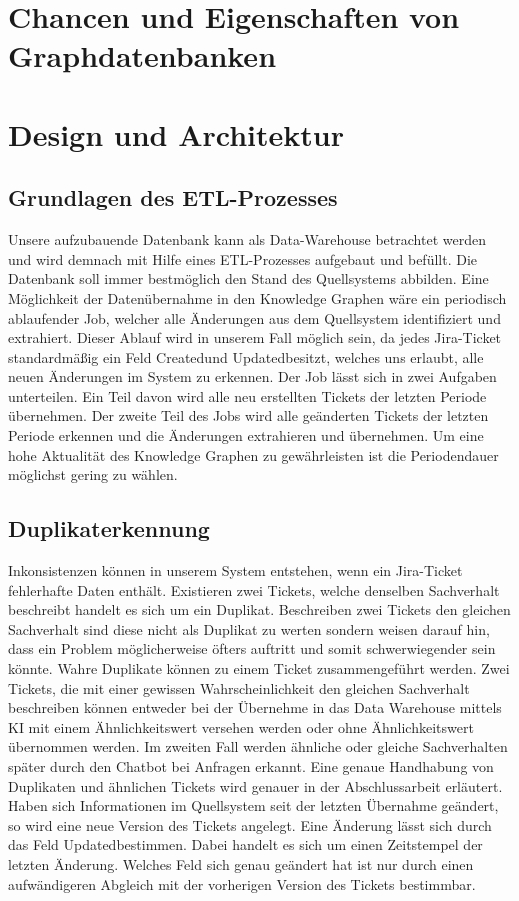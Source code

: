 \documentclass[10pt]{article}
\begin{document}
\section{Chancen und Eigenschaften von Graphdatenbanken}
\section{Design und Architektur}
\subsection{Grundlagen des ETL-Prozesses}
Unsere aufzubauende Datenbank kann als Data-Warehouse betrachtet werden und wird demnach mit Hilfe eines ETL-Prozesses aufgebaut und befüllt. Die Datenbank soll immer bestmöglich den Stand des Quellsystems abbilden. Eine Möglichkeit der Datenübernahme in den Knowledge Graphen wäre ein periodisch ablaufender Job, welcher alle Änderungen aus dem Quellsystem identifiziert und extrahiert. Dieser Ablauf wird in unserem Fall möglich sein, da jedes Jira-Ticket standardmäßig ein Feld \glqq Created\grqq\:und \glqq Updated\grqq\:besitzt, welches uns erlaubt, alle neuen Änderungen im System zu erkennen. Der Job lässt sich in zwei Aufgaben unterteilen. Ein Teil davon wird alle neu erstellten Tickets der letzten Periode übernehmen. Der zweite Teil des Jobs wird alle geänderten Tickets der letzten Periode erkennen und die Änderungen extrahieren und übernehmen. Um eine hohe Aktualität des Knowledge Graphen zu gewährleisten ist die Periodendauer möglichst gering zu wählen. \\
\subsection{Duplikaterkennung}
Inkonsistenzen können in unserem System entstehen, wenn ein Jira-Ticket fehlerhafte Daten enthält. Existieren zwei Tickets, welche denselben Sachverhalt beschreibt handelt es sich um ein Duplikat. Beschreiben zwei Tickets den gleichen Sachverhalt sind diese nicht als Duplikat zu werten sondern weisen darauf hin, dass ein Problem möglicherweise öfters auftritt und somit schwerwiegender sein könnte. Wahre Duplikate können zu einem Ticket zusammengeführt werden. Zwei Tickets, die mit einer gewissen Wahrscheinlichkeit den gleichen Sachverhalt beschreiben können entweder bei der Übernehme in das Data Warehouse mittels KI mit einem Ähnlichkeitswert versehen werden oder ohne Ähnlichkeitswert übernommen werden. Im zweiten Fall werden ähnliche oder gleiche Sachverhalten später durch den Chatbot bei Anfragen erkannt. Eine genaue Handhabung von Duplikaten und ähnlichen Tickets wird genauer in der Abschlussarbeit erläutert.\\
Haben sich Informationen im Quellsystem seit der letzten Übernahme geändert, so wird eine neue Version des Tickets angelegt. Eine Änderung lässt sich durch das Feld \glqq Updated\grqq\:bestimmen. Dabei handelt es sich um einen Zeitstempel der letzten Änderung. Welches Feld sich genau geändert hat ist nur durch einen aufwändigeren Abgleich mit der vorherigen Version des Tickets bestimmbar.
\end{document}
